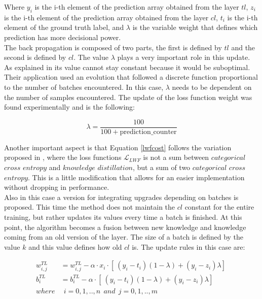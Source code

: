\documentclass[12pt]{report}
\begin{document}
Where $y_i$ is the i-th element of the prediction array obtained from the layer $tl$, $z_i$ is the i-th element of the prediction array obtained from the layer $cl$, $t_i$ is the i-th element of the ground truth label, and $\lambda$ is the variable weight that defines which prediction has more decisional power.\\
The back propagation is composed of two parts, the first is defined by $tl$ and the second is defined by $cl$. The value $\lambda$ plays a very important role in this update. As explained in \cite{maltoni2019continuous} its value cannot stay constant because it would be suboptimal. Their application used an evolution that followed a discrete function proportional to the number of batches encountered. In this case, $\lambda$ needs to be dependent on the number of samples encountered. The update of the loss function weight was found experimentally and is the following:

\begin{equation}
	\lambda = \frac{100}{100+ \text{prediction$\_$counter}}
\end{equation}

Another important aspect is that Equation \ref{lwfcost} follows the variation proposed in \cite{maltoni2019continuous}, where the loss functions $\mathcal{L}_{LWF}$ is not a sum between $categorical$ $cross$ $entropy$ and $knowledge$ $distillation$, but a sum of two $categorical$ $cross$ $entropy$. This is a little modification that allows for an easier implementation without dropping in performance. \\
Also in this case a version for integrating upgrades depending on batches is proposed. This time the method does not maintain the $cl$ constant for the entire training, but rather updates its values every time a batch is finished. At this point, the algorithm becomes a fusion between new knowledge and knowledge coming from an old version of the layer. The size of a batch is defined by the value $k$ and this value defines how old $cl$ is. The update rules in this case are:

\begin{align}
	w^{TL}_{i,j} &= w^{TL}_{i,j} - \alpha \cdot x_i \cdot [\ (y_i - t_i)(1-\lambda) + (y_i - z_i)\lambda ]\ \\
	b^{TL}_i     &= b^{TL}_i - \alpha \cdot [\ (y_i - t_i)(1-\lambda) + (y_i - z_i)\lambda ]\ \\
	where        & \: \: i= 0,1,..,n  \: \: and \: \:  j=0,1,..,m \nonumber  
\end{align} 
\end{document}
